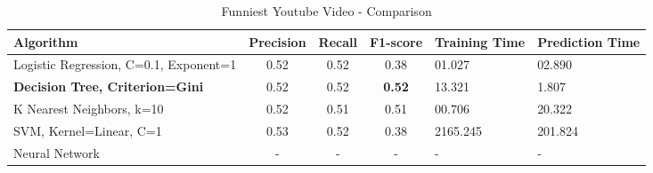\begin{table}[p]
\begin{center}
\begin{tabular}{|p{5cm}|c|c|c|p{2cm}|p{2cm}|}
\hline Algorithm & Precision & Recall & F1-score & Training Time & Prediction Time \\
\hline Logistic Regression, C=0.1, Exponent=1 & 0.52 & 0.52 & 0.38 & 01.027 &
02.890\\
\hline {\bf Decision Tree, Criterion=Gini} & 0.52 & 0.52 & {\bf 0.52} & 13.321 &
1.807\\
\hline K Nearest Neighbors, k=10 & 0.52 & 0.51 & 0.51 & 00.706 & 20.322 \\
\hline SVM, Kernel=Linear, C=1 & 0.53 & 0.52 & 0.38 &
2165.245 & 201.824\\
\hline Neural Network & - & - & - & - & -\\
\hline
\end{tabular}
\caption{Funniest Youtube Video - Comparison}
\label{table:ds3:comparison}
\end{center}
\end{table}




